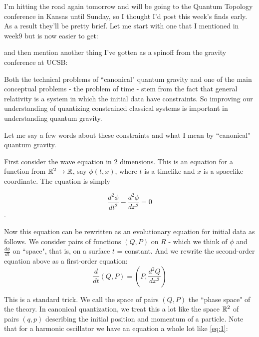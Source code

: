 
I'm hitting the road again tomorrow and will be going to the Quantum Topology conference in Kansas until Sunday, so I thought I'd post this week's finds early. As a result they'll be pretty brief. Let me start with one that I mentioned in week9 but is now easier to get:


and then mention another thing I've gotten as a spinoff from the gravity conference at UCSB:


Both the technical problems of ``canonical" quantum gravity and one of the main conceptual problems - the problem of time - stem from the fact that general relativity is a system in which the initial data have constraints. So improving our understanding of quantizing constrained classical systems is important in understanding quantum gravity.

Let me say a few words about these constraints and what I mean by ``canonical" quantum gravity.

First consider the wave equation in 2 dimensions. This is an equation for a function from $\mathbb R^2 \to \mathbb R$, say $\phi(t,x)$, where $t$ is a timelike and $x$ is a spacelike coordinate. The equation is simply

\[\frac{d^2\phi}{dt^2} - \frac{d^2\phi}{dx^2} = 0\].

Now this equation can be rewritten as an evolutionary equation for initial data as follows. We consider pairs of functions $(Q,P)$ on $R$ - which we think of $\phi$ and $\frac{d\phi}{dt}$ on ``space", that is, on a surface $t$ = constant. And we rewrite the second-order equation above as a first-order equation:
\begin{equation}
\tag{1}\label{eq:1}
\frac{d}{dt}(Q,P) = (P, \frac{d^2Q}{dx^2})
\end{equation}

This is a standard trick. We call the space of pairs $(Q,P)$ the ``phase space" of the theory. In canonical quantization, we treat this a lot like the space $\mathbb R^2$ of pairs $(q,p)$ describing the initial position and momentum of a particle. Note that for a harmonic oscillator we have an equation a whole lot like \ref{eq:1}:

